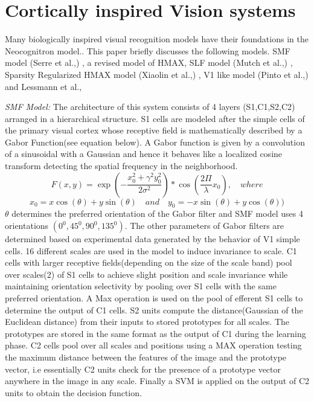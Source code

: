 \documentclass[12pt,twoside]{article}
\theoremstyle{plain}
\theoremstyle{definition}
\theoremstyle{remark}
\begin{document}
\section{Cortically inspired Vision systems}
\label{sec:corticalmodels}
Many biologically inspired visual recognition models have their foundations in the Neocognitron model.\cite{Fukushim1980}. This paper briefly discusses the following models. SMF model (Serre et al.,) \cite{ThomasSerre2007}, a revised model of HMAX\cite{MaximilianRiesenhuber1999}, SLF model (Mutch et al.,) \cite{JimMutch2008}, Sparsity Regularized HMAX model (Xiaolin et al.,) \cite{XiaolinHu2014}, V1 like model (Pinto et al.,)\cite{NicolasPinto2008} and Lessmann et al., \cite{MarkusLessmann2014}

\textit{SMF Model: }The architecture of this system consists of 4 layers (S1,C1,S2,C2) arranged in a hierarchical structure. S1 cells are modeled after the simple cells of the primary visual cortex whose receptive field is mathematically described\cite{JPJones1987} by a Gabor Function(see equation below)\cite{Gabor1946}. A Gabor function is given by a convolution of a sinusoidal with a Gaussian and hence it behaves like a localized cosine transform detecting the spatial frequency in the neighborhood. 
\begin{equation}\label{eq:Gabor}
F(x,y) = \exp(-\frac{x_0^2 + \gamma^2y_0^2}{2\sigma^2})*\cos(\frac{2\Pi}{\lambda}x_0), \quad where 
\end{equation}
\begin{equation}\label{eq:Gabor_or}
x_0 = x\cos(\theta)+y\sin(\theta) \quad and \quad y_0 = -x\sin(\theta) + y\cos(\theta))
\end{equation}
$\theta $ determines the preferred orientation of the Gabor filter and SMF model uses 4 orientations $(0^0,45^0,90^0,135^0)$. The other parameters of Gabor filters are determined based on experimental data generated by the behavior of V1 simple cells\cite{ThomasSerre2004}. 16 different scales are used in the model to induce invariance to scale. C1 cells with larger receptive fields(depending on the size of the scale band)\cite{ThomasSerre2007} pool over scales(2) of S1 cells to achieve slight position and scale invariance while maintaining orientation selectivity by pooling over S1 cells with the same preferred orientation. A Max operation is used on the pool of efferent S1 cells to determine the output of C1 cells. S2 units compute the distance(Gaussian of the Euclidean distance) from their inputs to stored prototypes for all scales. The prototypes are stored in the same format as the output of C1 during the learning phase. C2 cells pool over all scales and positions using a MAX operation testing the maximum distance between the features of the image and the prototype vector, i.e essentially C2 units check for the presence of a prototype vector anywhere in the image in any scale. Finally a SVM is applied on the output of C2 units to obtain the decision function. \\
\end{document}
